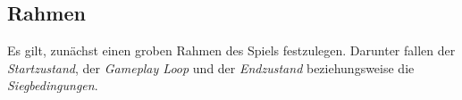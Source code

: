 \subsection{Rahmen}
Es gilt, zunächst einen groben Rahmen des Spiels festzulegen. Darunter fallen der \textit{Startzustand}, der \textit{Gameplay Loop} und der \textit{Endzustand} beziehungsweise die \textit{Siegbedingungen}.

